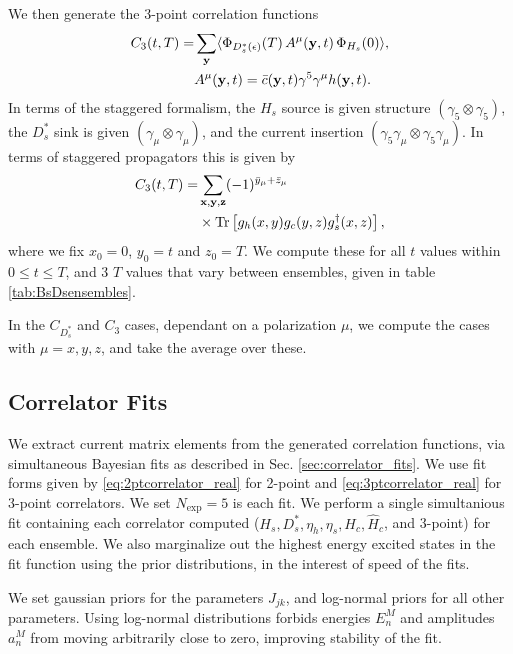 We then generate the 3-point correlation functions
\begin{align}
  C_3(t,T) =& \sum_{{\bf{y}}} \langle \Phi_{D_s^*(\epsilon)}(T)\, A^{\mu}({\bf{y}},t) \,\Phi_{H_s}(0) \rangle, \\
  &A^{\mu}({\bf{y}},t) = \bar{c}({\bf{y}},t) \gamma^5\gamma^{\mu} h({\bf{y}},t). \nonumber
\end{align}
In terms of the staggered formalism, the $H_s$ source is given structure $(\gamma_5\otimes \gamma_5)$, the $D_s^*$ sink is given $(\gamma_{\mu}\otimes \gamma_{\mu})$, and the current insertion $(\gamma_5\gamma_{\mu}\otimes \gamma_5\gamma_{\mu})$. In terms of staggered propagators this is given by
\begin{align}
  C_3(t,T) =& \sum_{{\bf{x},\bf{y},\bf{z}}} (-1)^{\bar{y}_{\mu}+\bar{z}_{\mu}}  \nonumber \\ &\times\text{Tr}\left[ g_h(x,y)g_c(y,z) g^{\dagger}_s(x,z) \right],
\end{align}
where we fix $x_0 = 0$, $y_0=t$ and $z_0=T$. We compute these for all $t$ values within $0\leq t\leq T$, and 3 $T$ values that vary between ensembles, given in table \ref{tab:BsDsensembles}.

In the $C_{D_s^*}$ and $C_3$ cases, dependant on a polarization $\mu$, we compute the cases with $\mu = x,y,z$, and take the average over these.

\subsection{Correlator Fits}

We extract current matrix elements from the generated correlation functions, via simultaneous Bayesian fits as described in Sec. \ref{sec:correlator_fits}. We use fit forms given by \eqref{eq:2ptcorrelator_real} for 2-point and \eqref{eq:3ptcorrelator_real} for 3-point correlators. We set $N_{\text{exp}}=5$ is each fit. We perform a single simultanious fit containing each correlator computed ($H_s,D_s^*,\eta_h,\eta_s,H_c,\hat{H}_c$, and 3-point) for each ensemble. We also marginalize out the highest energy excited states in the fit function using the prior distributions, in the interest of speed of the fits.

We set gaussian priors for the parameters $J_{jk}$, and log-normal priors for all other parameters. Using log-normal distributions forbids energies $E_n^M$ and amplitudes $a_n^M$ from moving arbitrarily close to zero, improving stability of the fit.

